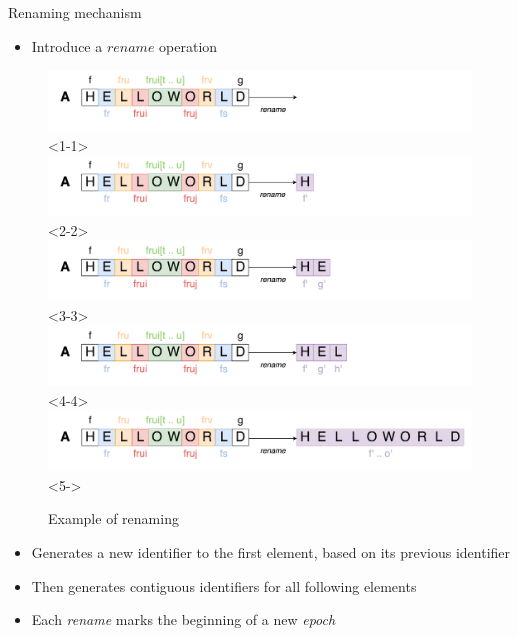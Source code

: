 \documentclass[10pt]{beamer}
\begin{document}
\begin{frame}{Renaming mechanism}
  \begin{itemize}
    \item Introduce a $rename$ operation
  \end{itemize}
  \begin{figure}
    \includegraphics[scale=0.11]{img/renaming-0.png}<1-1>
    \includegraphics[scale=0.11]{img/renaming-1.png}<2-2>
    \includegraphics[scale=0.11]{img/renaming-2.png}<3-3>
    \includegraphics[scale=0.11]{img/renaming-3.png}<4-4>
    \includegraphics[scale=0.11]{img/renaming.png}<5->
    \caption{Example of renaming}
  \end{figure}
  \begin{itemize}
    \item<2-> Generates a new identifier to the first element, based on its previous identifier
    \item<3-> Then generates contiguous identifiers for all following elements
    \item<6-> Each \emph{rename} marks the beginning of a new \emph{epoch}
  \end{itemize}
\end{frame}
\end{document}
